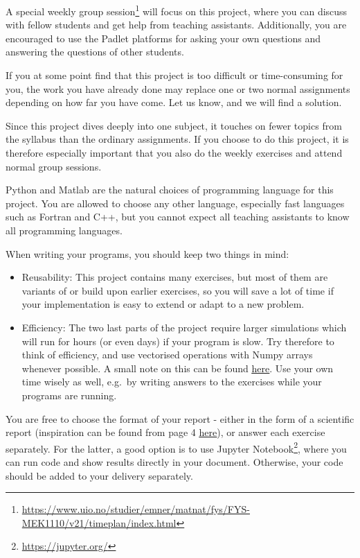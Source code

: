 \documentclass[11pt,british,a4paper]{report}
\begin{document}
A special weekly group session\footnote{\url{https://www.uio.no/studier/emner/matnat/fys/FYS-MEK1110/v21/timeplan/index.html}} will focus on this project, where you can discuss with fellow students and get help from teaching assistants. Additionally, you are encouraged to use the Padlet platforms for asking your own questions and answering the questions of other students.

If you at some point find that this project is too difficult or time-consuming for you, the work you have already done may replace one or two normal assignments depending on how far you have come. Let us know, and we will find a solution.

Since this project dives deeply into one subject, it touches on fewer topics from the syllabus than the ordinary assignments. If you choose to do this project, it is therefore especially important that you also do the weekly exercises and attend normal group sessions.

Python and Matlab are the natural choices of programming language for this project. You are allowed to choose any other language, especially fast languages such as Fortran and C++, but you cannot expect all teaching assistants to know all programming languages.

When writing your programs, you should keep two things in mind:
\begin{itemize}
    \item Reusability: This project contains many exercises, but most of them are variants of or build upon earlier exercises, so you will save a lot of time if your implementation is easy to extend or adapt to a new problem.
    \item Efficiency: The two last parts of the project require larger simulations which will run for hours (or even days) if your program is slow. Try therefore to think of efficiency, and use vectorised operations with Numpy arrays whenever possible. A small note on this can be found \href{https://github.com/uio-fys-mek/md-prosjekt/blob/master/vektorisering.ipynb}{\underline{here}}. Use your own time wisely as well, e.g.\ by writing answers to the exercises while your programs are running.
\end{itemize}

You are free to choose the format of your report - either in the form of a scientific report (inspiration can be found from page 4 \href{http://compphysics.github.io/ComputationalPhysics/doc/pub/projectwriting/pdf/projectwriting-print.pdf}{\underline{here}}), or answer each exercise separately. For the latter, a good option is to use Jupyter Notebook\footnote{\url{https://jupyter.org/}}, where you can run code and show results directly in your document. Otherwise, your code should be added to your delivery separately. 
\end{document}
